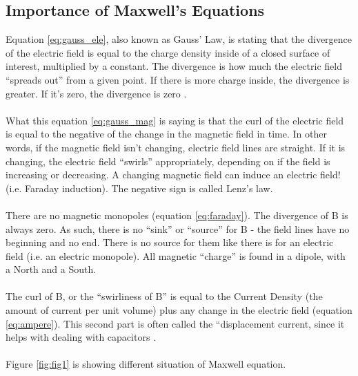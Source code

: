 \documentclass[a5paper, 12pt]{article}
\begin{document}
\subsection{Importance of Maxwell's Equations}
Equation \ref{eq:gauss_ele}, also known as Gauss’ Law, is stating that the divergence of the electric field is equal to the charge density inside of a closed surface of interest, multiplied by a constant. The divergence is how much the electric field “spreads out” from a given point. If there is more charge inside, the divergence is greater. If it’s zero, the divergence is zero \cite{Baillet200114}.
\\
\\
What this equation \ref{eq:gauss_mag} is saying is that the curl of the electric field is equal to the negative of the change in the magnetic field in time. In other words, if the magnetic field isn’t changing, electric field lines are straight. If it is changing, the electric field “swirls” appropriately, depending on if the field is increasing or decreasing. A changing magnetic field can induce an electric field! (i.e. Faraday induction). The negative sign is called Lenz’s law.
\\
\\
There are no magnetic monopoles (equation \ref{eq:faraday}). The divergence of B is always zero. As such, there is no “sink” or “source” for B - the field lines have no beginning and no end. There is no source for them like there is for an electric field (i.e. an electric monopole). All magnetic “charge” is found in a dipole, with a North and a South.
\\
\\
The curl of B, or the “swirliness of B” is equal to the Current Density (the amount of current per unit volume) plus any change in the electric field (equation \ref{eq:ampere}). This second part is often called the “displacement current, since it helps with dealing with capacitors \cite{Yee1966302}.
\\
\\
Figure \ref{fig:fig1} is showing different situation of Maxwell equation.






\newpage


\end{document}
